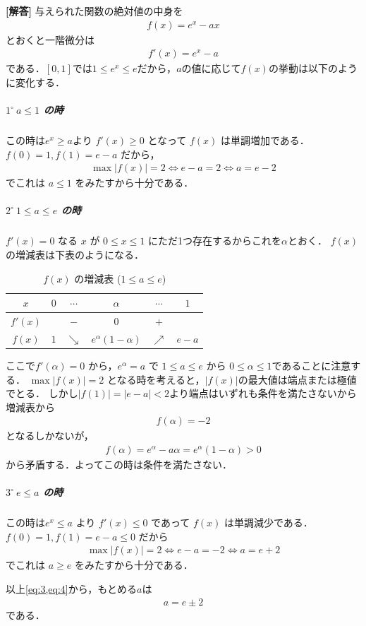 \documentclass[../../main.tex]{subfiles}
\begin{document}
\begin{oframed}
  
\end{oframed}

{\bf [解答]}
与えられた関数の絶対値の中身を
\begin{align}
  f(x)=e^x-ax \label{eq:1}
\end{align}
とおくと一階微分は
\begin{align}
  f'(x)=e^x-a \label{eq:2}
\end{align}
である．$[0,1]$では$1 \le e^{x} \le e$だから，$a$の値に応じて$f(x)$の挙動は以下のように変化する．

\subparagraph{$1^\circ\ a\le1$ の時}

この時は$e^{x} \ge a$より $f'(x)\ge0$ となって $f(x)$ は単調増加である．
$f(0)=1,f(1)=e-a$ だから，
\begin{align}
  \max|f(x)|=2 \iff e-a=2 \iff a=e-2 \label{eq:3}
\end{align}
でこれは $a\le1$ をみたすから十分である．

\subparagraph{$2^\circ\ 1\le a\le e$ の時}

$f'(x)=0$ なる $x$ が $0\le x\le1$ にただ1つ存在するからこれを$\alpha$とおく．
$f(x)$の増減表は下表のようになる．

\begin{table}[htb]
  \centering
  \caption{$f(x)$ の増減表 ($1 \le a \le e$)}
  \begin{tabular}{c|ccccc}
    $x$ & $0$ & $\cdots$ & $\alpha$ & $\cdots$ & $1$ \\
    \hline
    $f'(x)$ & & $-$ & $0$ & $+$ & \\
    \hline
    $f(x)$ & $1$ & $\searrow$ & $e^\alpha(1-\alpha)$ & $\nearrow$ & $e-a$
  \end{tabular}
\end{table}

ここで$f'(\alpha)=0$ から，$e^\alpha=a$ で $1\le a\le e$ から $0\le\alpha\le1$であることに注意する．
$\max|f(x)|=2$ となる時を考えると，$|f(x)|$の最大値は端点または極値でとる．
しかし$|f(1)|=|e-a|<2$より端点はいずれも条件を満たさないから増減表から
\begin{align}
  f(\alpha) = -2
\end{align}
となるしかないが，
\begin{align}
  f(\alpha)=e^\alpha-a\alpha=e^\alpha(1-\alpha)>0
\end{align}
から矛盾する．よってこの時は条件を満たさない．

\subparagraph{$3^\circ\ e\le a$ の時}

この時は$e^x \le a$ より $f'(x)\le0$ であって $f(x)$ は単調減少である．
$f(0)=1,f(1)=e-a \le 0$ だから
\begin{align}
  \max|f(x)|=2\iff e-a=-2\iff a=e+2 \label{eq:4}
\end{align}
でこれは $a\ge e$ をみたすから十分である．
\casesend

以上\cref{eq:3,eq:4}から，もとめる$a$は
\begin{align}
  a=e\pm2
\end{align}
である．

\newpage
\end{document}

